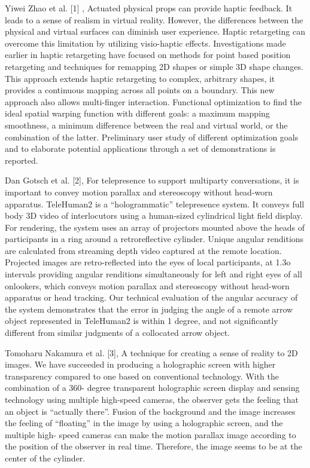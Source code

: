 \documentclass{fisatproject}
\begin{document}
\par Yiwei Zhao et al. [1] ,
Actuated physical props can provide haptic feedback. It leads to a sense of realism in virtual reality. However, the differences between the physical and virtual surfaces can diminish user experience. Haptic retargeting can overcome this limitation by utilizing visio-haptic effects. Investigations made earlier in haptic retargeting have focused on methods for point based position retargeting and techniques for remapping 2D shapes or simple 3D shape changes. This approach extends haptic retargeting to complex, arbitrary shapes, it provides a continuous mapping across all points on a boundary. This new approach also allows multi-finger interaction.  Functional optimization to find the ideal spatial warping function with different goals: a maximum mapping smoothness, a minimum difference between the real and virtual world, or the combination of the latter.  Preliminary user study of different optimization goals and to elaborate potential applications through a set of demonstrations is reported.
\par Dan Gotsch et al. [2],  For telepresence to support multiparty conversations, it is important to convey motion parallax and stereoscopy without head-worn apparatus. TeleHuman2 is a “hologrammatic” telepresence system. It conveys full body 3D video of interlocutors using a human-sized cylindrical light field display. For rendering, the system uses an array of projectors mounted above the heads of participants in a ring around a retroreflective cylinder. Unique angular renditions are calculated from streaming depth video captured at the remote location. Projected images are retro-reflected into the eyes of local participants, at 1.3o intervals providing angular renditions simultaneously for left and right eyes of all onlookers, which conveys motion parallax and stereoscopy without head-worn apparatus or head tracking. Our technical evaluation of the angular accuracy of the system demonstrates that the error in judging the angle of a remote arrow object represented in TeleHuman2 is within 1 degree, and not significantly different from similar judgments of a collocated arrow object.
\par Tomoharu Nakamura et al. [3], A technique for creating a sense of reality to 2D images. We have succeeded in producing a holographic screen with higher transparency compared to one based on conventional technology. With the combination of a 360- degree transparent holographic screen display and sensing technology using multiple high-speed cameras, the observer gets the feeling that an object is “actually there”. Fusion of the background and the image increases the feeling of “floating” in the image by using a holographic screen, and the multiple high- speed cameras can make the motion parallax image according to the position of the observer in real time. Therefore, the image seems to be at the center of the cylinder.
\end{document}
